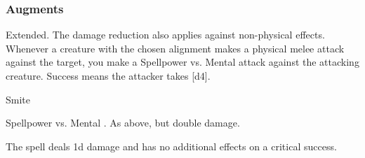\subsubsection{Augments}
 Extended.
The damage reduction also applies against non-physical effects.
Whenever a creature with the chosen alignment makes a physical melee attack against the target, you make a Spellpower vs. Mental attack against the attacking creature.
Success means the attacker takes [d4].
\begin{spellsection}{Smite}
\begin{spellheader}
\end{spellheader}
\begin{spellcontent}
\begin{spelltargetinginfo}
\end{spelltargetinginfo}
\begin{spelleffects}
\begin{spellattack}{Spellpower vs. Mental}
\spellsuccess {}.
\spellcritical As above, but double damage.
\end{spellattack}
\end{spelleffects}
\end{spellcontent}
\begin{spellfooter}
\miscastexplode
\end{spellfooter}
\begin{spellcantrip}
The spell deals \minus1d damage and has no additional effects on a critical success.
\end{spellcantrip}
\end{spellsection}
